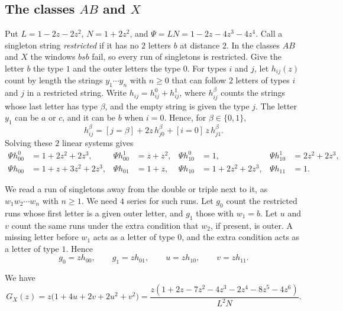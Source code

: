 \subsection{\texorpdfstring{The classes $AB$ and $X$}{The classes AB and X}}\label{sec:threeruns}

Put $L=1-2z-2z^2$, $N=1+2z^2$, and $\Psi=LN=1-2z-4z^3-4z^4$. Call a singleton
string \emph{restricted} if it has no $2$ letters $b$ at distance $2$. In the
classes $AB$ and $X$ the windows $bsb$ fail, so every run of singletons is
restricted. Give the letter $b$ the type $1$ and the outer letters the type
$0$. For types $i$ and $j$, let $h_{ij}(z)$ count by length the strings
$y_1\cdots y_n$ with $n\ge0$ that can follow $2$ letters of types $i$ and $j$ in
a restricted string. Write $h_{ij}=h_{ij}^0+h_{ij}^1$, where $h_{ij}^\beta$
counts the strings whose last letter has type $\beta$, and the empty string is
given the type $j$. The letter $y_1$ can be $a$ or $c$, and it can be $b$ when
$i=0$. Hence, for $\beta\in\{0,1\}$,
\[
h_{ij}^\beta=[j=\beta]+2z\,h_{j0}^\beta+[i=0]\,z\,h_{j1}^\beta .
\]
Solving these $2$ linear systems gives
\begin{equation}\label{eq:hsol}
\begin{aligned}
\Psi h_{00}^0&=1+2z^2+2z^3,&\Psi h_{00}^1&=z+z^2,&\Psi h_{10}^0&=1,&\Psi h_{10}^1&=2z^2+2z^3,\\
\Psi h_{00}&=1+z+3z^2+2z^3,&\Psi h_{01}&=1+z,&\Psi h_{10}&=1+2z^2+2z^3,&\Psi h_{11}&=1.
\end{aligned}
\end{equation}

We read a run of singletons away from the double or triple next to it, as
$w_1w_2\cdots w_n$ with $n\ge1$. We need $4$ series for such runs. Let $g_0$
count the restricted runs whose first letter is a given outer letter, and
$g_1$ those with $w_1=b$. Let $u$ and $v$ count the same runs under the extra
condition that $w_2$, if present, is outer. A missing letter before $w_1$ acts
as a letter of type $0$, and the extra condition acts as a letter of type
$1$. Hence
\begin{equation}\label{eq:runs}
g_0=zh_{00},\qquad g_1=zh_{01},\qquad u=zh_{10},\qquad v=zh_{11}.
\end{equation}

\begin{proposition}\label{prop:GX}
We have
\[
G_X(z)=z\bigl(1+4u+2v+2u^2+v^2\bigr)
=\frac{z(1+2z-7z^2-4z^3-2z^4-8z^5-4z^6)}{L^2N}.
\]
\end{proposition}

